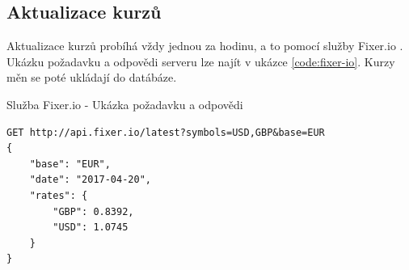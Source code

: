 \subsection{Aktualizace kurzů}
Aktualizace kurzů probíhá vždy jednou za hodinu, a to pomocí služby Fixer.io \cite{fixer-io}. Ukázku požadavku a odpovědi serveru lze najít v ukázce \ref{code:fixer-io}. Kurzy měn se poté ukládají do datábáze.

\begin{listing}[h]
\caption{\label{code:fixer-io}Služba Fixer.io - Ukázka požadavku a odpovědi}
\begin{verbatim}
GET http://api.fixer.io/latest?symbols=USD,GBP&base=EUR
{
    "base": "EUR",
    "date": "2017-04-20",
    "rates": {
        "GBP": 0.8392,
        "USD": 1.0745
    }
}
\end{verbatim}
\end{listing}
